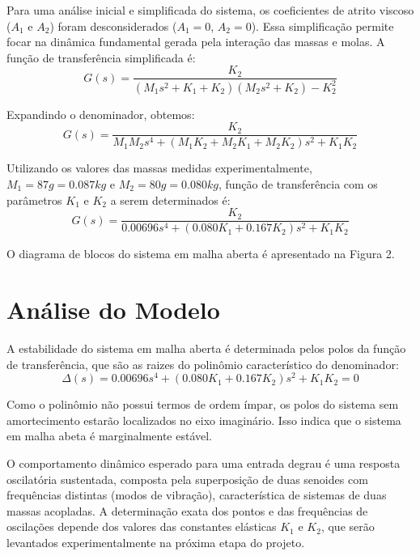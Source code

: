 \documentclass[9pt,a4paper,twocolumn,twoside]{tau-class/tau}
\begin{document}
Para uma análise inicial e simplificada do sistema, os coeficientes de atrito viscoso ($A_1$ e $A_2$) foram desconsiderados ($A_1 = 0$, $A_2 = 0$). Essa simplificação permite focar na dinâmica fundamental gerada pela interação das massas e molas. A função de transferência simplificada é:
\begin{equation}
    G(s) = \frac{K_2}{(M_1 s^2 + K_1 + K_2)(M_2 s^2 + K_2) - K_2 ^2}
\label{eq: FT_simp}
\end{equation}

Expandindo o denominador, obtemos:
\begin{equation}
    G(s) = \frac{K_2}{M_1 M_2 s^4 + (M_1 K_2 + M_2 K_1 + M_2 K_2)s^2 + K_1 K_2}
\label{eq: FT_exp}
\end{equation}

Utilizando os valores das massas medidas experimentalmente, $M_1 = 87 g = 0.087 kg$ e $M_2 = 80g = 0.080kg$, função de transferência com os parâmetros $K_1$ e $K_2$ a serem determinados é:
\begin{equation}
    G(s) = \frac{K_2}{0.00696 s^4 + (0.080 K_1 + 0.167 K_2)s^2 + K_1 K_2}
\label{eq: FT_valoresmassa}
\end{equation}

O diagrama de blocos do sistema em malha aberta é apresentado na Figura 2.

\section{Análise do Modelo}

A estabilidade do sistema em malha aberta é determinada pelos polos da função de transferência, que são as raizes do polinômio característico do denominador:
\begin{equation}
    \Delta (s) = 0.00696 s^4 + (0.080 K_1 + 0.167 K_2)s^2 + K_1 K_2 = 0
\label{eq:raizes}
\end{equation}

Como o polinômio não possui termos de ordem ímpar, os polos do sistema sem amortecimento estarão localizados no eixo imaginário. Isso indica que o sistema em malha abeta é marginalmente estável.

O comportamento dinâmico esperado para uma entrada degrau é uma resposta oscilatória sustentada, composta pela superposição de duas senoides com frequências distintas (modos de vibração), característica de sistemas de duas massas acopladas. A determinação exata dos pontos e das frequências de oscilações depende dos valores das constantes elásticas $K_1$ e $K_2$, que serão levantados experimentalmente na próxima etapa do projeto.
\end{document}
